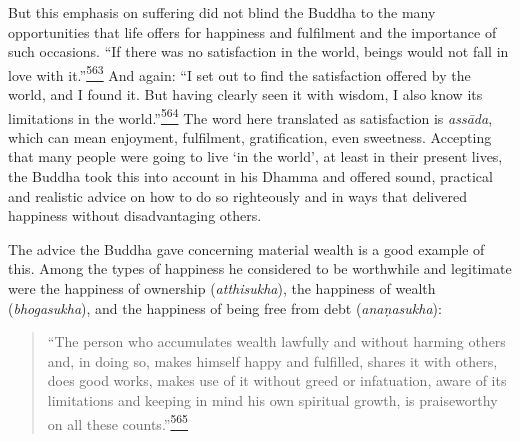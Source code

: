 But this emphasis on suffering did not blind the Buddha to the many
opportunities that life offers for happiness and fulfilment and the
importance of such occasions. ``If there was no satisfaction in the
world, beings would not fall in love with
it.''\label{footprints_split_015.html_fnref563}\hyperref[footprints_split_025.htmlux5cux23fn563]{\textsuperscript{563}}
And again: ``I set out to find the satisfaction offered by the world,
and I found it. But having clearly seen it with wisdom, I also know its
limitations in the
world.''\label{footprints_split_015.html_fnref564}\hyperref[footprints_split_025.htmlux5cux23fn564]{\textsuperscript{564}}
The word here translated as satisfaction is \emph{assāda}, which can
mean enjoyment, fulfilment, gratification, even sweetness. Accepting
that many people were going to live `in the world', at least in their
present lives, the Buddha took this into account in his Dhamma and
offered sound, practical and realistic advice on how to do so
righteously and in ways that delivered happiness without disadvantaging
others.

The advice the Buddha gave concerning material wealth is a good example
of this. Among the types of happiness he considered to be worthwhile and
legitimate were the happiness of ownership (\emph{atthisukha}), the
happiness of wealth (\emph{bhogasukha}), and the happiness of being free
from debt (\emph{anaṇasukha}):

\begin{quote}
``The person who accumulates wealth lawfully and without harming others
and, in doing so, makes himself happy and fulfilled, shares it with
others, does good works, makes use of it without greed or infatuation,
aware of its limitations and keeping in mind his own spiritual growth,
is praiseworthy on all these
counts.''\label{footprints_split_015.html_fnref565}\hyperref[footprints_split_025.htmlux5cux23fn565]{\textsuperscript{565}}
\end{quote}

